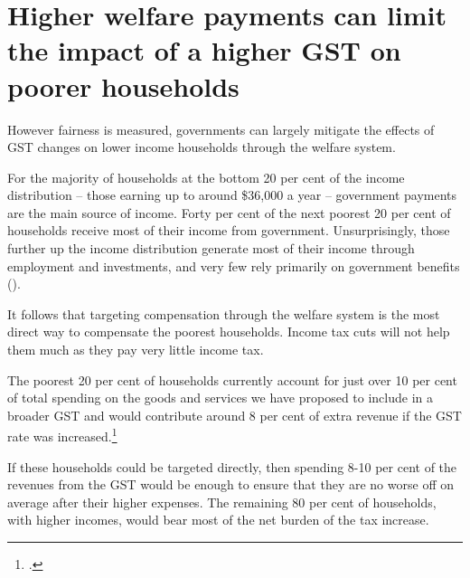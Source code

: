 \section{Higher welfare payments can limit the impact of a higher GST on poorer households}\label{sec:GST-3-2}
However fairness is measured, governments can largely mitigate the effects of GST changes on lower income households through the welfare system.

For the majority of households at the bottom 20 per cent of the income distribution – those earning up to around \$36,000 a year  – government payments are the main source of income. Forty per cent of the next poorest 20 per cent of households receive most of their income from government. Unsurprisingly, those further up the income distribution generate most of their income through employment and investments, and very few rely primarily on government benefits (). 



It follows that targeting compensation through the welfare system is the most direct way to compensate the poorest households. Income tax cuts will not help them much as they pay very little income tax. 

The poorest 20 per cent of households currently account for just over 10 per cent of total spending on the goods and services we have proposed to include in a broader GST and would contribute around 8 per cent of extra revenue if the GST rate was increased.\footcite{ABS2015HouseholdIncomeWealth1314}

If these households could be targeted directly, then spending 8-10 per cent of the revenues from the GST would be enough to ensure that they are no worse off on average after their higher expenses. The remaining 80 per cent of households, with higher incomes, would bear most of the net burden of the tax increase.

